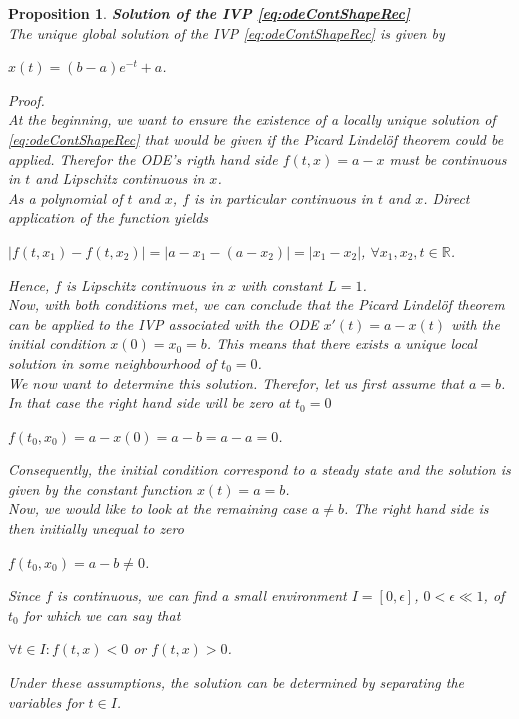 \documentclass[a4paper,12pt,leqno]{article}
\theoremstyle{plain}
\newtheorem{proposition}[theorem]{Proposition}
\theoremstyle{remark}
\newcommand{\R}{\mathbb{R}}
\begin{document}
\begin{proposition} \textbf{Solution of the IVP \eqref{eq:odeContShapeRec}}\\
	The unique global solution of the IVP \eqref{eq:odeContShapeRec} is given by 
	\begin{center}
		$x(t) = (b-a)e^{-t} + a$.
	\end{center}
	Proof. \\
	At the beginning, we want to ensure the existence of a locally unique solution of \eqref{eq:odeContShapeRec} that would be given if the Picard Lindelöf theorem could be applied. Therefor the ODE's rigth hand side $f(t, x) = a - x$ must be continuous in $t$ and Lipschitz continuous in $x$. \\
	As a polynomial of $t$ and $x$, $f$ is in particular continuous in $t$ and $x$. Direct application of the function yields
	\begin{center}
		$|f(t, x_1) - f(t, x_2)| = | a - x_1 - (a - x_2)| = |x_1 - x_2|$, $\forall x_1, x_2, t \in \R$. 
	\end{center}
	Hence, $f$ is Lipschitz continuous in $x$ with constant $L = 1$. \\
	Now, with both conditions met, we can conclude that the Picard Lindelöf theorem can be applied to the IVP associated with the ODE $x'(t) = a - x(t)$ with the initial condition $x(0) = x_0 = b$. This means that there exists a unique local solution in some neighbourhood of $t_0 = 0$. \\
	We now want to determine this solution. Therefor, let us first assume that $a = b$. In that case the right hand side will be zero at $t_0 = 0$ 
	\begin{center}
		$f(t_0, x_0) = a - x(0) = a - b = a - a = 0 $. 
	\end{center}
	Consequently, the initial condition correspond to a steady state and the solution is given by the constant function $x(t) = a = b$. \\ 
	Now, we would like to look at the remaining case $a \neq b$. The right hand side is then initially unequal to zero 
	\begin{center}
		$f(t_0, x_0) = a - b \neq 0$. 
	\end{center}
	Since $f$ is continuous, we can find a small environment $I = [0, \epsilon]$, $0 < \epsilon \ll 1$, of $t_0$ for which we can say that
	\begin{center}
		$\forall t \in I: f(t, x) < 0$ or $ f(t, x) > 0$. 
	\end{center}
	Under these assumptions, the solution can be determined by separating the variables for $t \in I$.

\end{proposition}
\end{document}
